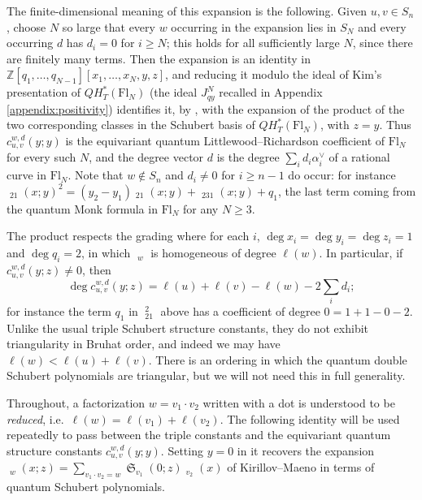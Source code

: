 \documentclass{amsart}
\theoremstyle{definition}
\theoremstyle{remark}
\numberwithin{equation}{section}
\DeclareMathOperator{\sch}{\mathfrak{S}}
\DeclareMathOperator{\qsch}{\widetilde{\mathfrak{S}}}
\begin{document}
The finite-dimensional meaning of this expansion is the following. Given $u,v\in S_n$, choose $N$ so large that every $w$ occurring in the expansion lies in $S_N$ and every occurring $d$ has $d_i=0$ for $i\geq N$; this holds for all sufficiently large $N$, since there are finitely many terms. Then the expansion is an identity in $\mathbb Z[q_1,\ldots,q_{N-1}][x_1,\ldots,x_N,y,z]$, and reducing it modulo the ideal of Kim's presentation of $QH_T^*(\mathrm{Fl}_N)$ \cite{kim1996equivariant} (the ideal $J_{qy}^N$ recalled in Appendix \ref{appendix:positivity}) identifies it, by \cite{lam2014quantum}, with the expansion of the product of the two corresponding classes in the Schubert basis of $QH_T^*(\mathrm{Fl}_N)$, with $z=y$. Thus $c_{u,v}^{w,d}(y;y)$ is the equivariant quantum Littlewood--Richardson coefficient of $\mathrm{Fl}_N$ for every such $N$, and the degree vector $d$ is the degree $\sum_id_i\alpha_i^\vee$ of a rational curve in $\mathrm{Fl}_N$. Note that $w\notin S_n$ and $d_i\neq0$ for $i\geq n-1$ do occur: for instance $\qsch_{21}(x;y)^2=(y_2-y_1)\qsch_{21}(x;y)+\qsch_{231}(x;y)+q_1$, the last term coming from the quantum Monk formula in $\mathrm{Fl}_N$ for any $N\geq3$.

The product respects the grading where for each $i$, $\deg x_i=\deg y_i=\deg z_i=1$ and $\deg q_i=2$, in which $\qsch_w$ is homogeneous of degree $\ell(w)$. In particular, if $c_{u,v}^{w,d}(y;z)\neq 0$, then
$$\deg c_{u,v}^{w,d}(y;z)=\ell(u)+\ell(v)-\ell(w)-2\sum_i d_i;$$
for instance the term $q_1$ in $\qsch_{21}^2$ above has a coefficient of degree $0=1+1-0-2$. Unlike the usual triple Schubert structure constants, they do not exhibit triangularity in Bruhat order, and indeed we may have $\ell(w) < \ell(u) + \ell(v)$. There is an ordering in which the quantum double Schubert polynomials are triangular, but we will not need this in full generality.

Throughout, a factorization $w=v_1\cdot v_2$ written with a dot is understood to be \emph{reduced}, i.e.\ $\ell(w)=\ell(v_1)+\ell(v_2)$. The following identity will be used repeatedly to pass between the triple constants and the equivariant quantum structure constants $c_{u,v}^{w,d}(y;y)$. Setting $y=0$ in it recovers the expansion $\qsch_w(x;z)=\sum_{v_1\cdot v_2=w}\sch_{v_1}(0;z)\qsch_{v_2}(x)$ of Kirillov--Maeno \cite{kirillov2000quantum} in terms of quantum Schubert polynomials.
\end{document}
